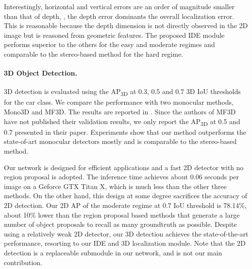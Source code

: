 Interestingly, horizontal and vertical errors are an order of magnitude smaller than that of depth, \ie, the depth error dominants the overall localization error. This is reasonable because the depth dimension is not directly observed in the 2D image but is reasoned from geometric features. The proposed IDE module performs superior to the others for the easy and moderate regimes and comparable to the stereo-based method for the hard regime. 






\paragraph{3D Object Detection.}
3D detection is evaluated using the AP\textsubscript{3D} at 0.3, 0.5 and 0.7 3D IoU thresholds for the car class. We compare the performance with two monocular methods, Mono3D and MF3D. The results are reported in \tab{\ref{tab:3dap}}. Since the authors of MF3D have not published their validation results, we only report the AP\textsubscript{3D} at 0.5 and 0.7 presented in their paper. Experiments show that our method outperforms the state-of-art monocular detectors mostly and is comparable to the stereo-based method.

Our network is designed for efficient applications and a fast 2D detector with no region proposal is adopted. The inference time achieves about 0.06 seconds per image on a Geforce GTX Titan X, which is much less than the other three methods. On the other hand, this design at some degree sacrifices the accuracy of 2D detection. Our 2D AP of the moderate regime at 0.7 IoU threshold is 78.14\%, about 10\% lower than the region proposal based methods that generate a large number of object proposals to recall as many groundtruth as possible. Despite using a relatively weak 2D detector, our 3D detection achieves the state-of-the-art performance, resorting to our IDE and 3D localization module. Note that the 2D detection is a replaceable submodule in our network, and is not our main contribution. 





